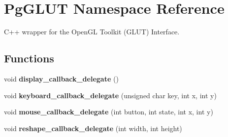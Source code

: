 \hypertarget{namespace_pg_g_l_u_t}{
\section{PgGLUT Namespace Reference}
\label{namespace_pg_g_l_u_t}
}
C++ wrapper for the OpenGL Toolkit (GLUT) Interface.  


\subsection*{Functions}
\begin{CompactItemize}
\item 
\hypertarget{namespace_pg_g_l_u_t_dc257363e1d73c55e485f9390dc7d0ec}{
void \textbf{display\_\-callback\_\-delegate} ()}
\label{namespace_pg_g_l_u_t_dc257363e1d73c55e485f9390dc7d0ec}

\item 
\hypertarget{namespace_pg_g_l_u_t_7c2f4e929842756e319c350fabfc0567}{
void \textbf{keyboard\_\-callback\_\-delegate} (unsigned char key, int x, int y)}
\label{namespace_pg_g_l_u_t_7c2f4e929842756e319c350fabfc0567}

\item 
\hypertarget{namespace_pg_g_l_u_t_5521a446b17cd0e988d07dea42dfa1a7}{
void \textbf{mouse\_\-callback\_\-delegate} (int button, int state, int x, int y)}
\label{namespace_pg_g_l_u_t_5521a446b17cd0e988d07dea42dfa1a7}

\item 
\hypertarget{namespace_pg_g_l_u_t_76180d553527db550a7b2a05ed8af317}{
void \textbf{reshape\_\-callback\_\-delegate} (int width, int height)}
\label{namespace_pg_g_l_u_t_76180d553527db550a7b2a05ed8af317}


\end{CompactItemize}

